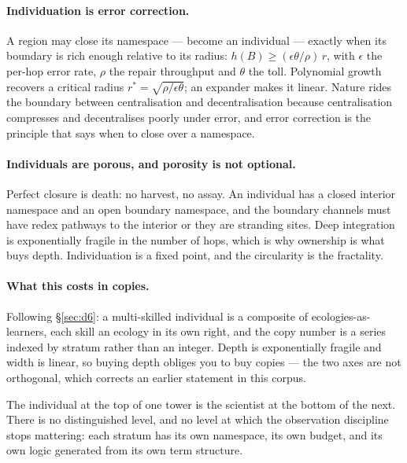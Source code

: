 \paragraph{Individuation is error correction.} A region may close its namespace ---
become an individual --- exactly when its boundary is rich enough relative to its
radius: $h(B) \ge (\epsilon\theta/\rho)\,r$, with $\epsilon$ the per-hop error
rate, $\rho$ the repair throughput and $\theta$ the toll. Polynomial growth
recovers a critical radius $r^{*} = \sqrt{\rho/\epsilon\theta}$; an expander makes
it linear. Nature rides the boundary between centralisation and decentralisation
because centralisation compresses and decentralises poorly under error, and error
correction is the principle that says when to close over a namespace.

\paragraph{Individuals are porous, and porosity is not optional.} Perfect closure
is death: no harvest, no assay. An individual has a closed interior namespace and
an open boundary namespace, and the boundary channels must have redex pathways to
the interior or they are stranding sites. Deep integration is exponentially
fragile in the number of hops, which is why ownership is what buys depth.
Individuation is a fixed point, and the circularity is the fractality.

\paragraph{What this costs in copies.} Following \S\ref{sec:d6}: a multi-skilled
individual is a composite of ecologies-as-learners, each skill an ecology in its
own right, and the copy number is a series indexed by stratum rather than an
integer. Depth is exponentially fragile and width is linear, so buying depth
obliges you to buy copies --- the two axes are not orthogonal, which corrects an
earlier statement in this corpus.

\begin{observation}
\label{obs:loop}
The individual at the top of one tower is the scientist at the bottom of the next.
There is no distinguished level, and no level at which the observation discipline
stops mattering: each stratum has its own namespace, its own budget, and its own
logic generated from its own term structure.
\end{observation}

